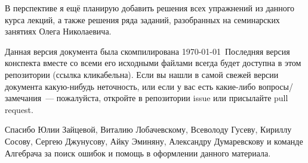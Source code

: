 В перспективе я ещё планирую добавить решения всех упражнений из данного курса лекций, а также решения ряда заданий, разобранных на семинарских занятиях Олега Николаевича.

Данная версия документа была скомпилирована \today~Последняя версия конспекта вместе со всеми его исходными файлами всегда будет доступна в этом~ репозитории (ссылка кликабельна). Если вы нашли в самой свежей версии документа какую-нибудь неточность, или если у вас есть какие-либо вопросы/замечания --- пожалуйста, откройте в репозитории issue или присылайте pull request.

Спасибо Юлии Зайцевой, Виталию Лобачевскому, Всеволоду Гусеву, Кириллу Сосову, Сергею Джунусову, Айку Эминяну, Александру Думаревскову и команде Алгебрача за поиск ошибок и помощь в оформлении данного материала.

\normalfont
\newpage

